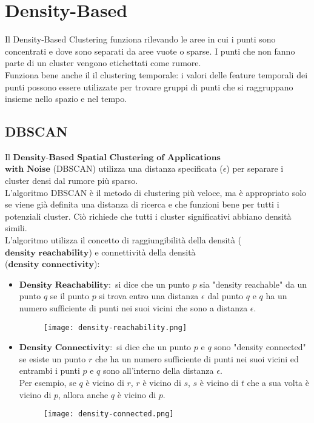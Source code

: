 \section{Density-Based}
    Il Density-Based Clustering funziona rilevando le aree in cui i punti sono concentrati e dove sono separati da aree vuote o sparse.
    I punti che non fanno parte di un cluster vengono etichettati come rumore.
    \\[1\baselineskip]
    Funziona bene anche il il clustering temporale: i valori delle feature temporali dei punti possono essere utilizzate per trovare gruppi di punti che si raggruppano insieme nello spazio e nel tempo.
    \\[1\baselineskip]

    \subsection{DBSCAN}
        Il $\textbf{Density-Based Spatial Clustering of Applications}$\\$\textbf{with Noise}$ (DBSCAN) utilizza una distanza specificata ($\epsilon$) per separare i cluster densi dal rumore più sparso.
        \\[1\baselineskip]
        L'algoritmo DBSCAN è il metodo di clustering più veloce, ma è appropriato solo se viene già definita una distanza di ricerca e che funzioni bene per tutti i potenziali cluster.
        Ciò richiede che tutti i cluster significativi abbiano densità simili.
        \\[1\baselineskip]
        L'algoritmo utilizza il concetto di raggiungibilità della densità ($\textbf{density reachability}$) e connettività della densità\\ ($\textbf{density connectivity}$):
            \begin{itemize}
                \item $\textbf{Density Reachability}:$ si dice che un punto $p$ sia "density reachable" da un punto $q$ se il punto $p$ si trova entro una distanza $\epsilon$ dal punto $q$ e $q$ ha un numero sufficiente di punti nei suoi vicini che sono a distanza $\epsilon$.
                    \begin{figure}[h]
                        \centering
                        \texttt{[image: density-reachability.png]}
                    \end{figure}
                \item $\textbf{Density Connectivity}:$ si dice che un punto $p$ e $q$ sono "density connected" se esiste un punto $r$ che ha un numero sufficiente di punti nei suoi vicini ed entrambi i punti $p$ e $q$ sono all'interno della distanza $\epsilon$.
                    \\
                    Per esempio, se $q$ è vicino di $r$, $r$ è vicino di $s$, $s$ è vicino di $t$ che a sua volta è vicino di $p$, allora anche $q$ è vicino di $p$.
                    \begin{figure}[h]
                        \centering
                        \texttt{[image: density-connected.png]}
                    \end{figure}
            \end{itemize}

